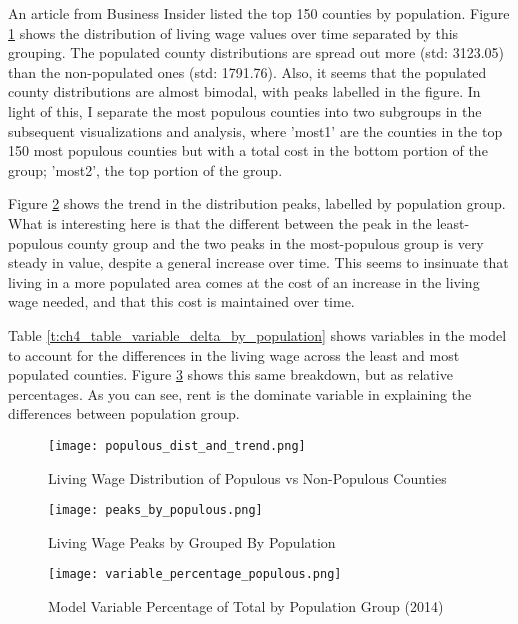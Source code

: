 An article from Business Insider \cite{populated_counties} listed the top 150 counties by population. Figure \ref{f:ch4_populous_dist_and_trend} shows the distribution of living wage values over time separated by this grouping. The populated county distributions are spread out more (std: 3123.05) than the non-populated ones (std: 1791.76). Also, it seems that the populated county distributions are almost bimodal, with peaks labelled in the figure. In light of this, I separate the most populous counties into two subgroups in the subsequent visualizations and analysis, where 'most1' are the counties in the top 150 most populous counties but with a total cost in the bottom portion of the group; 'most2', the top portion of the group.

Figure \ref{f:ch4_peaks_by_populous} shows the trend in the distribution peaks, labelled by population group. What is interesting here is that the different between the peak in the least-populous county group and the two peaks in the most-populous group is very steady in value, despite a general increase over time. This seems to insinuate that living in a more populated area comes at the cost of an increase in the living wage needed, and that this cost is maintained over time.

Table \ref{t:ch4_table_variable_delta_by_population} shows variables in the model to account for the differences in the living wage across the least and most populated counties. Figure \ref{f:ch4_variable_percentage_populous} shows this same breakdown, but as relative percentages. As you can see, rent is the dominate variable in explaining the differences between population group.

\begin{figure}[H]
    \centering
        \texttt{[image: populous\_dist\_and\_trend.png]}
        \caption{Living Wage Distribution of Populous vs Non-Populous Counties}
    \label{f:ch4_populous_dist_and_trend}
\end{figure}

\begin{figure}[H]
    \centering
        \texttt{[image: peaks\_by\_populous.png]}
        \caption{Living Wage Peaks by Grouped By Population}
    \label{f:ch4_peaks_by_populous}
\end{figure}

\begin{figure}[H]
    \centering
        \texttt{[image: variable\_percentage\_populous.png]}
        \caption{Model Variable Percentage of Total by Population Group (2014)}
    \label{f:ch4_variable_percentage_populous}
\end{figure}

